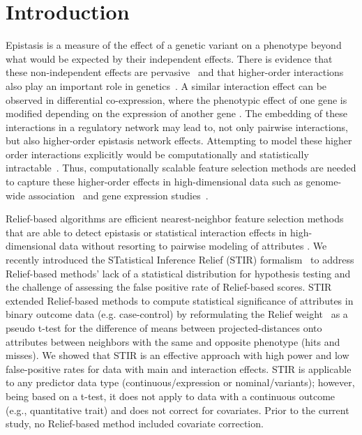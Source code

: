 \documentclass[10pt]{article}
\begin{document}
\linenumbers

\section{Introduction}

Epistasis is a measure of the effect of a genetic variant on a phenotype beyond what would be expected by their independent effects. There is evidence that these non-independent effects are pervasive~\cite{breen12} and that higher-order interactions also play an important role in genetics~\cite{weinreich13}. 
A similar interaction effect can be observed in differential co-expression, where the phenotypic effect of one gene is modified depending on the expression of another gene \cite{lareau15,diffcoexp10}.
The embedding of these interactions in a regulatory network may lead to, not only pairwise interactions, but also higher-order epistasis network effects. Attempting to model these higher order interactions explicitly would be computationally and statistically intractable~\cite{riesselman18}.
Thus, computationally scalable feature selection methods are needed to capture these higher-order effects in high-dimensional data such as genome-wide association~\cite{titv} and gene expression studies~\cite{stir}.

Relief-based algorithms are efficient nearest-neighbor feature selection methods that are able to detect epistasis or statistical interaction effects in high-dimensional data without resorting to pairwise modeling of attributes \cite{urbanowicz17b,kononenko97, mckinney09, robnik2003theoretical}.
We recently introduced the STatistical Inference Relief (STIR) formalism~\cite{stir} to address Relief-based methods' lack of a statistical distribution for hypothesis testing and the challenge of assessing the false positive rate of Relief-based scores.
STIR extended Relief-based methods to compute statistical significance of attributes in binary outcome data (e.g. case-control) by reformulating the Relief weight~\cite{mckinney13} as a pseudo t-test for the difference of means between projected-distances onto attributes between neighbors with the same and opposite phenotype (hits and misses). We showed that STIR is an effective approach with high power and low false-positive rates for data with main and interaction effects. 
STIR is applicable to any predictor data type (continuous/expression or nominal/variants); however, being based on a t-test, it does not apply to data with a continuous outcome (e.g., quantitative trait) and does not correct for covariates.
Prior to the current study, no Relief-based method included covariate correction.  
\end{document}
